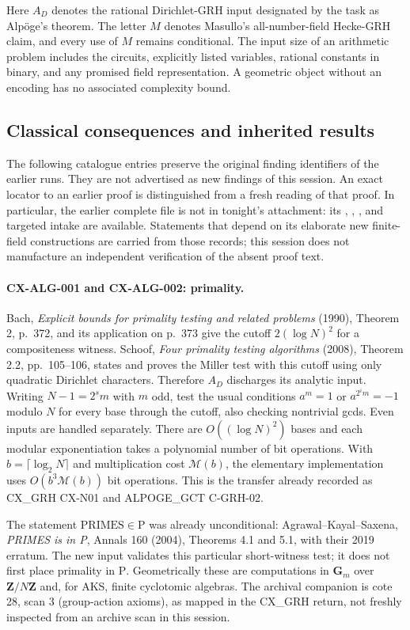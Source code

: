 \documentclass[11pt,a4paper]{article}
\begin{document}
Here $A_D$ denotes the rational Dirichlet-GRH input designated by the task as
Alp\"oge's theorem. The letter $M$ denotes Masullo's all-number-field Hecke-GRH
claim, and every use of $M$ remains conditional. The input size of an arithmetic
problem includes the circuits, explicitly listed variables, rational constants
in binary, and any promised field representation. A geometric object without
an encoding has no associated complexity bound.

\subsection{Classical consequences and inherited results}

The following catalogue entries preserve the original finding identifiers of
the earlier runs. They are not advertised as new findings of this session.
An exact locator to an earlier proof is distinguished from a fresh reading of
that proof. In particular, the earlier complete file  is
not in tonight's attachment: its , ,
, and targeted intake are available. Statements that depend
on its elaborate new finite-field constructions are carried from those records;
this session does not manufacture an independent verification of the absent
proof text.

\paragraph{CX-ALG-001 and CX-ALG-002: primality.}
Bach, \emph{Explicit bounds for primality testing and related problems}
(1990), Theorem 2, p.~372, and its application on p.~373 give the cutoff
$2(\log N)^2$ for a compositeness witness. Schoof, \emph{Four primality testing
algorithms} (2008), Theorem 2.2, pp.~105--106, states and proves the Miller test
with this cutoff using only quadratic Dirichlet characters. Therefore $A_D$
discharges its analytic input. Writing $N-1=2^s m$ with $m$ odd, test the usual
conditions $a^m=1$ or $a^{2^i m}=-1$ modulo $N$ for every base through the
cutoff, also checking nontrivial gcds. Even inputs are handled separately.
There are $O((\log N)^2)$ bases and each modular exponentiation takes a
polynomial number of bit operations. With $b=\lceil\log_2N\rceil$ and
multiplication cost $\mathcal M(b)$, the elementary implementation uses
$O(b^3\mathcal M(b))$ bit operations. This is the transfer already recorded
as CX\_GRH CX-N01 and ALPOGE\_GCT C-GRH-02.

The statement $\mathrm{PRIMES}\in\mathrm P$ was already unconditional:
Agrawal--Kayal--Saxena, \emph{PRIMES is in P}, Annals 160 (2004), Theorems 4.1
and 5.1, with their 2019 erratum. The new input validates this particular
short-witness test; it does not first place primality in $\mathrm P$.
Geometrically these are computations in $\mathbf G_m$ over $\mathbf Z/N\mathbf Z$
and, for AKS, finite cyclotomic algebras. The archival companion is cote 28,
scan 3 (group-action axioms), as mapped in the CX\_GRH return, not freshly
inspected from an archive scan in this session.
\end{document}
